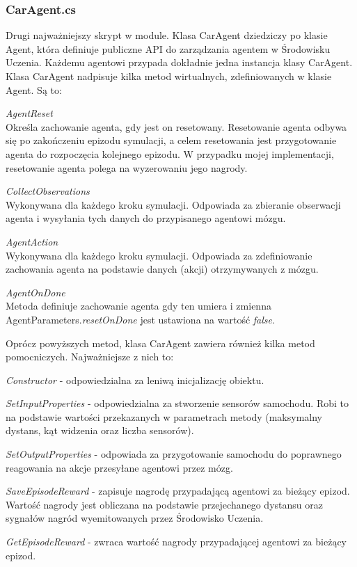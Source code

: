 \subsubsection{CarAgent.cs}
Drugi najważniejszy skrypt w module. Klasa CarAgent dziedziczy po klasie Agent, która definiuje publiczne API do zarządzania agentem w Środowisku Uczenia. Każdemu agentowi przypada dokładnie jedna instancja klasy CarAgent.
Klasa CarAgent nadpisuje kilka metod wirtualnych, zdefiniowanych w klasie Agent. Są to:
\begin{enumerate*}
\item \textit{AgentReset} \\
Określa zachowanie agenta, gdy jest on resetowany. Resetowanie agenta odbywa się po zakończeniu epizodu symulacji, a celem resetowania jest przygotowanie agenta do rozpoczęcia kolejnego epizodu. W przypadku mojej implementacji, resetowanie agenta polega na wyzerowaniu jego nagrody.
\item \textit{CollectObservations} \\
Wykonywana dla każdego kroku symulacji. Odpowiada za zbieranie obserwacji agenta i wysyłania tych danych do przypisanego  agentowi mózgu.
\item \textit{AgentAction} \\
Wykonywana dla każdego kroku symulacji. Odpowiada za zdefiniowanie zachowania agenta na podstawie danych (akcji) otrzymywanych z mózgu.
\item \textit{AgentOnDone} \\
Metoda definiuje zachowanie agenta gdy ten umiera i zmienna AgentParameters.\textit{resetOnDone} jest ustawiona na wartość \textit{false}.
\end{enumerate*}

Oprócz powyższych metod, klasa CarAgent zawiera również kilka metod pomocniczych. Najważniejsze z nich to:
\begin{enumerate*}
\item \textit{Constructor} - odpowiedzialna za leniwą inicjalizację obiektu.
\item \textit{SetInputProperties} - odpowiedzialna za stworzenie sensorów samochodu. Robi to na podstawie wartości przekazanych w parametrach metody (maksymalny dystans, kąt widzenia oraz liczba sensorów).
\item \textit{SetOutputProperties} - odpowiada za przygotowanie samochodu do poprawnego reagowania na akcje przesyłane agentowi przez mózg.
\item \textit{SaveEpisodeReward} - zapisuje nagrodę przypadającą agentowi za bieżący epizod. Wartość nagrody jest obliczana na podstawie przejechanego dystansu oraz sygnałów nagród wyemitowanych przez Środowisko Uczenia.
\item \textit{GetEpisodeReward} - zwraca wartość nagrody przypadającej agentowi za bieżący epizod.
\end{enumerate*}

